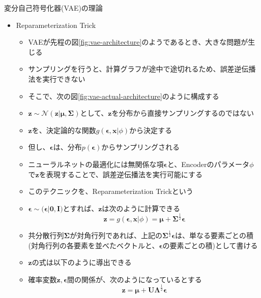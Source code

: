 \documentclass[dvipdfmx,notheorems,t]{beamer}
\begin{document}
\begin{frame}{変分自己符号化器(VAE)の理論}

\begin{itemize}
	\item Reparameterization Trick
	\begin{itemize}
		\item VAEが先程の図\ref{fig:vae-architecture}のようであるとき、\alert{大きな問題が生じる}
		\item サンプリングを行うと、計算グラフが途中で途切れるため、\alert{誤差逆伝播法を実行できない}
		\newline
		
		\item そこで、次の図\ref{fig:vae-actual-architecture}のように構成する
		\item $\bm{z} \sim \mathcal{N}(\bm{z} | \bm{\mu}, \bm{\Sigma})$として、$\bm{z}$を分布から直接サンプリングするのではない
		\item $\bm{z}$を、\alert{決定論的な関数}$g(\bm{\epsilon}, \bm{x} | \phi)$から決定する
		\item 但し、$\bm{\epsilon}$は、分布$p(\bm{\epsilon})$からサンプリングされる
		\newline
		
		\item ニューラルネットの最適化には無関係な項$\bm{\epsilon}$と、Encoderのパラメータ$\phi$で$\bm{z}$を表現することで、誤差逆伝播法を実行可能にする
		\item このテクニックを、\alert{Reparameterization Trick}という
		\newline
		
		\item $\bm{\epsilon} \sim \mathcal(\bm{\epsilon} | \bm{0}, \bm{I})$とすれば、$\bm{z}$は次のように計算できる
		\begin{equation}
			\bm{z} = g(\bm{\epsilon}, \bm{x} | \phi) = \bm{\mu} + \bm{\Sigma}^\frac{1}{2} \bm{\epsilon}
		\end{equation}
		
		\item 共分散行列$\bm{\Sigma}$が対角行列であれば、上記の$\bm{\Sigma}^\frac{1}{2} \bm{\epsilon}$は、単なる要素ごとの積(対角行列の各要素を並べたベクトルと、$\bm{\epsilon}$の要素ごとの積)として書ける
		\newline
		
		\item $\bm{z}$の式は以下のように導出できる
		\newline
		
		\item 確率変数$\bm{z}, \bm{\epsilon}$間の関係が、次のようになっているとする
		\begin{equation}
			\bm{z} = \bm{\mu} + \bm{U} \bm{\Lambda}^\frac{1}{2} \bm{\epsilon}
		\end{equation}
		

\end{itemize}
\end{itemize}
\end{frame}
\end{document}
